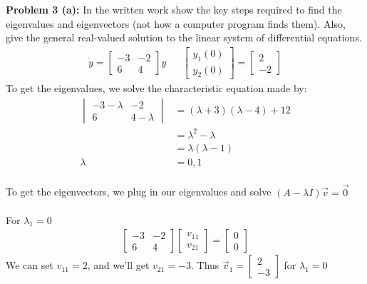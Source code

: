 \documentclass[12pt]{article}
\begin{document}
\noindent \textbf{Problem 3 (a): }In the written work show the key steps required to find the eigenvalues and eigenvectors (not how a computer program finds them). Also, give the general real-valued solution to the linear system of differential equations.
\begin{align*}
\dot{y} = 
\begin{bmatrix}
-3 & -2 \\ 6 & 4
\end{bmatrix}
y
&& 
\begin{bmatrix}
y_1(0) \\ y_2(0)
\end{bmatrix}
= 
\begin{bmatrix}
2 \\ -2
\end{bmatrix}
\end{align*}
To get the eigenvalues, we solve the characteristic equation made by:
\begin{align*}
\begin{vmatrix}
-3 - \lambda & -2 \\
6 & 4 - \lambda 
\end{vmatrix}
&= (\lambda + 3)(\lambda - 4) + 12 \\
&= \lambda^2 - \lambda  \\
&= \lambda (\lambda - 1) \\
\lambda &= 0,1
\end{align*}
\\
To get the eigenvectors, we plug in our eigenvalues and solve $(A - \lambda I)\vec{v} = \vec{0}$
\\ \\
For $\lambda_1 = 0$
\begin{align*}
\begin{bmatrix}
-3 & -2 \\ 6 & 4
\end{bmatrix}
\begin{bmatrix}
v_{11} \\ v_{21}
\end{bmatrix}
= 
\begin{bmatrix}
0 \\ 0
\end{bmatrix}
\end{align*} 
We can set $v_{11} = 2$, and we'll get $v_{21} = -3$. Thus $\vec{v}_1 = \begin{bmatrix}	2 \\ -3	\end{bmatrix}$ for $\lambda_1 = 0$
\\ \\ 
\end{document}
